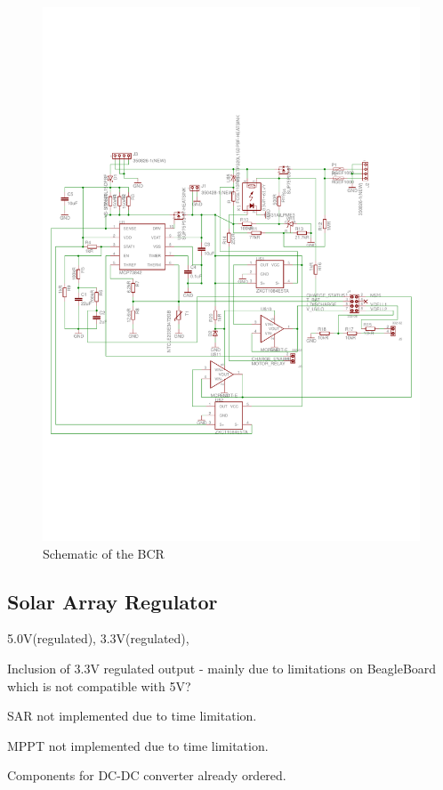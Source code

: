 %
\begin{figure}[H]
\centering
\includegraphics[width=\textwidth]{figures/fig_Schematic_BCR}
\caption{Schematic of the \acl{BCR}}
\label{fig:BCR_Schematic}
\end{figure}
%
%
\subsection{Solar Array Regulator}

5.0V(regulated), 3.3V(regulated),

Inclusion of 3.3V regulated output - mainly due to limitations on BeagleBoard which is not compatible with 5V?

SAR not implemented due to time limitation.

MPPT not implemented due to time limitation.

Components for DC-DC converter already ordered.


